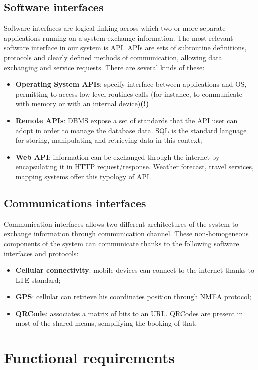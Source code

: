 \subsection{Software interfaces}
Software interfaces are logical linking across which two or more separate applications running on a system exchange information. The most relevant software interface in our system is API. APIs are sets of subroutine definitions, protocols and clearly defined methods of communication, allowing data exchanging and service requests. There are several kinds of these:
\begin{itemize}
\item \textbf{Operating System APIs}: specify interface between applications and OS, permitting to access low level routines calls (for instance, to communicate with memory or with an internal device)\textbf{(!)}
\item \textbf{Remote APIs}: DBMS expose a set of standards that the API user can adopt in order to manage the database data. SQL is the standard language for storing, manipulating and retrieving data in this context;
\item \textbf{Web API}: information can be exchanged through the internet by encapsulating it in HTTP request/response. Weather forecast, travel services, mapping systems offer this typology of API.
\end{itemize}

\subsection{Communications interfaces}
Communication interfaces allows two different architectures of the system to exchange information through communication channel. These non-homogeneous components of the system can communicate thanks to the following software interfaces and protocols:
\begin{itemize}
\item \textbf{Cellular connectivity}: mobile devices can connect to the internet thanks to LTE standard;
\item \textbf{GPS}: cellular can retrieve his coordinates position through NMEA protocol;
\item \textbf{QRCode}: associates a matrix of bits to an URL. QRCodes are present in most of the shared means, semplifying the booking of that.
\end{itemize}


\section{Functional requirements}
